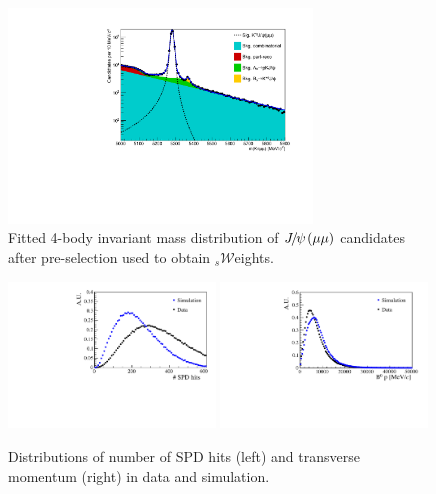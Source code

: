  \begin{figure}[h!]
\centering
\includegraphics[width=0.72\textwidth]{RKst/figs/sW/KstJPsMM_log.pdf}
\caption{Fitted 4-body invariant mass distribution of $\jpsi(\mu\mu)$ candidates 
after pre-selection used to obtain $_s\mathcal{W}$eights.}
\label{fig:RKst_sW_mass}
\end{figure}

\begin{figure}[h!]
\centering
\includegraphics[width=0.49\textwidth]{RKst/figs/nspd_12.pdf}
\includegraphics[width=0.49\textwidth]{RKst/figs/bpt.pdf}
\caption{Distributions of number of SPD hits (left) and \Bz transverse momentum (right) in data and simulation.}
\label{fig:b0pt_nSPD_distrib}
\end{figure}


